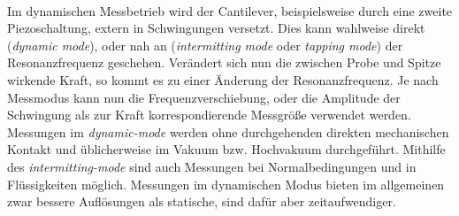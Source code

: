 \\
Im dynamischen Messbetrieb wird der Cantilever, beispielsweise durch eine zweite Piezoschaltung, extern in Schwingungen versetzt. Dies kann wahlweise direkt (\textit{dynamic mode}), oder nah an (\textit{intermitting mode} oder \textit{tapping mode}) der Resonanzfrequenz geschehen. Verändert sich nun die zwischen Probe und Spitze wirkende Kraft, so kommt es zu einer Änderung der Resonanzfrequenz. Je nach Messmodus kann nun die Frequenzverschiebung, oder die Amplitude der Schwingung als zur Kraft korrespondierende Messgröße verwendet werden. Messungen im \textit{dynamic-mode} werden ohne durchgehenden direkten mechanischen Kontakt und üblicherweise im Vakuum bzw. Hochvakuum durchgeführt. Mithilfe des \textit{intermitting-mode} sind auch Messungen bei Normalbedingungen und in Flüssigkeiten möglich.
Messungen im dynamischen Modus bieten im allgemeinen zwar bessere Auflösungen als statische, sind dafür aber zeitaufwendiger.

